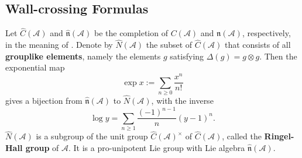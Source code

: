 \documentclass[a4paper,12pt]{amsart}
\begin{document}
\subsection{Wall-crossing Formulas}
Let $\hat{C}(\mathcal{A})$ and $\hat{\mathfrak{n}}(\mathcal{A})$ be the completion of $C(\mathcal{A})$ and $\mathfrak{n}(\mathcal{A})$, respectively, in the meaning of \cite{BT2012}. Denote by $\hat{N}(\mathcal{A})$ the subset of $\hat{C}(\mathcal{A})$ that consists of all \textbf{grouplike elements}, namely the elements $g$ satisfying $\Delta(g)=g\otimes g$. Then the exponential map
\[\exp x:=\sum_{n\geqslant0}\frac{x^n}{n!}\]
gives a bijection from $\hat{\mathfrak{n}}(\mathcal{A})$ to $\hat{N}(\mathcal{A})$, with the inverse
\[\log y=\sum_{n\geqslant1}\frac{(-1)^{n-1}}{n}(y-1)^n.\]
$\hat{N}(\mathcal{A})$ is a subgroup of the unit group $\hat{C}(\mathcal{A})^\times$ of $\hat{C}(\mathcal{A})$, called the \textbf{Ringel-Hall group} of $\mathcal{A}$. It is a pro-unipotent Lie group with Lie algebra $\hat{\mathfrak{n}}(\mathcal{A})$.
\end{document}
